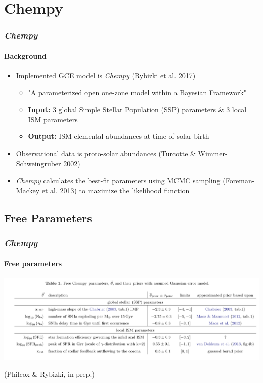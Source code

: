 \documentclass{beamer}
\begin{document}
\section{Chempy}
\begin{frame}
\frametitle{\textit{Chempy}}
\framesubtitle{Background}
\begin{itemize}
  \item Implemented GCE model is \textit{Chempy} (Rybizki et al. 2017)
  \begin{itemize}
  	\item "A parameterized open one-zone model within a Bayesian Framework"
  	\item \textbf{Input:} 3 global Simple Stellar Population (SSP) parameters \& 3 local ISM parameters
  	\item \textbf{Output:} ISM elemental abundances at time of solar birth
  \end{itemize}  
  \item Observational data is proto-solar abundances (Turcotte \& Wimmer-Schweingruber 2002)
  \item \textit{Chempy} calculates the best-fit parameters using MCMC sampling (Foreman-Mackey et al. 2013) to maximize the likelihood function
\end{itemize}
\end{frame}	

\subsection{Free Parameters}
\begin{frame}
\frametitle{\textit{Chempy}}
\framesubtitle{Free parameters}
  \includegraphics[width=\textwidth]{Prior.png}

 \tiny (Philcox \& Rybizki, in prep.)
\end{frame}
\end{document}
